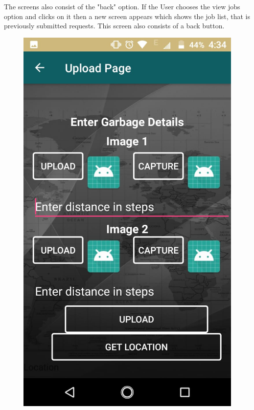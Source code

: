 The screens also consist of the "back" option.
If the User chooses the view jobs option and clicks on it then a new screen appears which shows the job list, that is previously submitted requests. This screen also consists of a back button.\\
\newpage
\begin{figure}[!hb]
   \centering

    \includegraphics[scale=0.2]{images/4.png}

\end{figure}
